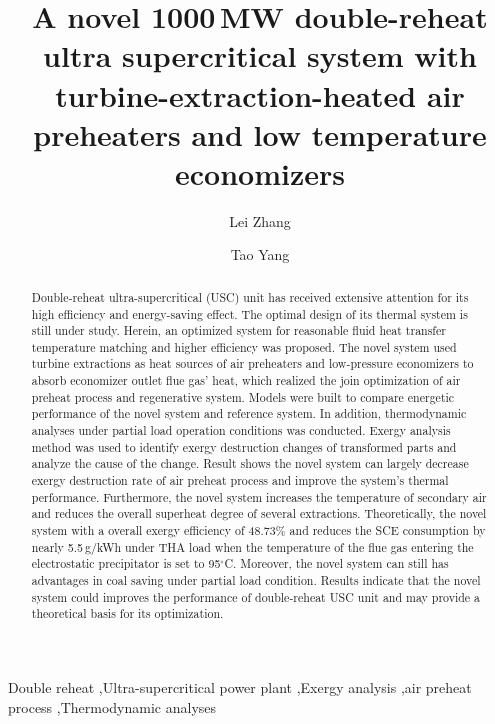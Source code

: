 \documentclass[preprint,12pt]{elsarticle}
\begin{document}
\begin{frontmatter}



\title{A novel 1000\,MW double-reheat ultra supercritical system with turbine-extraction-heated air preheaters and low temperature economizers}


\author[hust,ncst]{Lei Zhang}
\author[hust]{Tao Yang}

\address[hust]{School of Energy and Power Engineering, Huazhong University of Science and Technology, Wuhan 430074,China}
\address[ncst]{College of Metallurgy and Energy, NorthChina University of Science and and Technology, Tangshan 063009,China}

\begin{abstract}%
Double-reheat ultra-supercritical (USC) unit has received extensive attention for its high efficiency and energy-saving effect.
The optimal design of its thermal system is still under study.
Herein, an optimized system for reasonable fluid heat transfer temperature matching and higher efficiency was proposed.
The novel system used turbine extractions as heat sources of air preheaters and low-pressure economizers to absorb economizer outlet flue gas’ heat, which realized the join optimization of air preheat process and regenerative system.
Models were built to compare energetic performance of the novel system and reference system.
In addition, thermodynamic analyses under partial load operation conditions was conducted. 
Exergy analysis method was used to identify exergy destruction changes of transformed parts and analyze the cause of the change.
Result shows the novel system can largely decrease exergy destruction rate of air preheat process and improve the system's thermal performance.
Furthermore, the novel system increases the temperature of secondary air and reduces the overall superheat degree of several extractions.
Theoretically, the novel system with a overall exergy efficiency of 48.73\%  and reduces the SCE consumption by nearly 5.5\,g/kWh under THA load when the temperature of the flue gas entering the electrostatic precipitator is set to 95$^\circ$C.
Moreover, the novel system can still has advantages in coal saving under partial load condition.
Results indicate that the novel system could improves the performance of double-reheat USC unit and may provide a theoretical basis for its optimization.

\end{abstract}

\begin{keyword}
Double reheat \sep Ultra-supercritical power plant \sep Exergy analysis \sep air preheat process \sep Thermodynamic analyses
\end{keyword}

\end{frontmatter}
\end{document}
